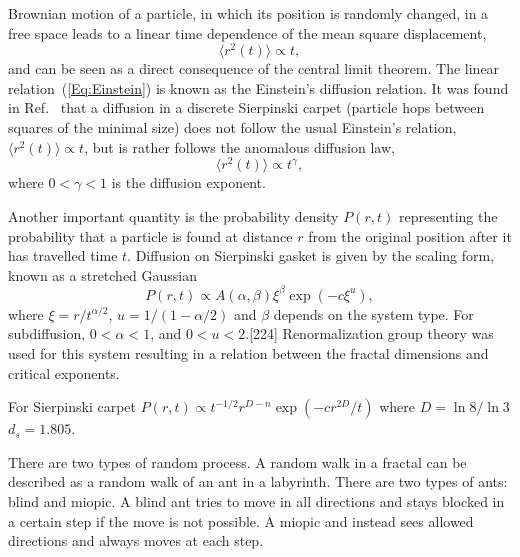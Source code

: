 \documentclass[aps,prl,reprint,onecolumn,superscriptaddress,floatfix,longbibliography]{revtex4-2}
\begin{document}
Brownian motion of a particle, in which its position is randomly changed, in a free space leads to a linear time dependence of the mean square displacement, 
\begin{equation}
\langle r^2(t)\rangle \propto t,
\label{Eq:Einstein}
\end{equation}
and can be seen as a direct consequence of the central limit theorem.
The linear relation~(\ref{Eq:Einstein}) is known as the Einstein's diffusion relation. 
It was found in Ref.~\cite{Hoffmann2010} that a diffusion in a discrete Sierpinski carpet (particle hops between squares of the minimal size) does not follow the usual Einstein's relation, $\langle r^2(t)\rangle\propto t$, but is rather follows the anomalous diffusion law\cite{MetzlerKlafter2000},
\begin{equation}
\langle r^2(t)\rangle \propto t^\gamma,
\end{equation}
where $0<\gamma<1$ is the diffusion exponent. 

Another important quantity is the probability density $P(r,t)$ representing the probability that a particle is found at distance $r$ from the original position after it has travelled time $t$. 
Diffusion on Sierpinski gasket is given by the scaling form, known as a stretched Gaussian\cite{EduardoRoman1995}
\begin{equation}
P(r,t)\propto A(\alpha,\beta) \xi^\beta \exp(-c\xi^u),
\end{equation}
where $\xi = r/t^{\alpha/2}$, $u=1/(1-\alpha/2)$ and $\beta$ depends on the system type. For subdiffusion, $0<\alpha<1$, and $0<u<2$.[224]
Renormalization group theory was used for this system resulting in a relation between the fractal dimensions and critical exponents\cite{Guyer1984}.

For Sierpinski carpet $P(r,t)\propto t^{-1/2} r^{D-n}\exp(-cr^{2D}/t)$ where $D=\ln 8/\ln 3$
$d_s = 1.805$.

There are two types of random process. A random walk in a fractal can be described as a random walk of an ant in a labyrinth. There are two types of ants: blind and miopic\cite{FRANZ2000}. A blind ant tries to move in all directions and stays blocked in a certain step if the move is not possible. A miopic and instead sees allowed directions and always moves at each step.
\end{document}

